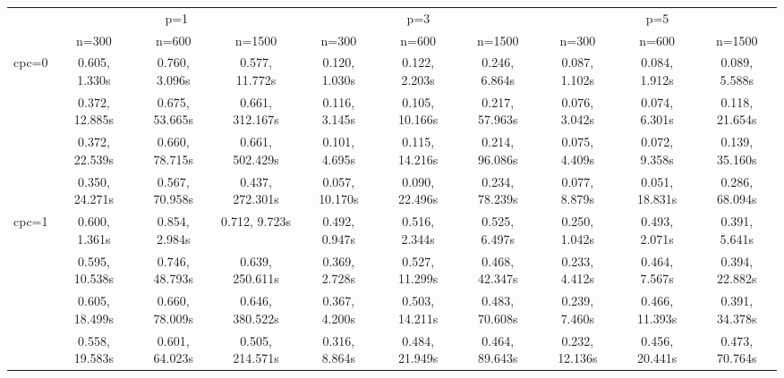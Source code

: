 \documentclass[article]{jss}
\begin{document}
\begin{landscape}

  \begin{table}[t!]
    \centering
    \begin{tabular}{@{}cccccccccc@{}}
    \toprule
                           & \multicolumn{3}{c}{p=1}                                            & \multicolumn{3}{c}{p=3}                                            & \multicolumn{3}{c}{p=5}                                            \\
                           & n=300                & n=600                & n=1500               & n=300                & n=600                & n=1500               & n=300                & n=600                & n=1500               \\ \midrule
    \multirow{4}{*}{cpc=0} & 0.605, 1.330s & 0.760, 3.096s & 0.577, 11.772s & 0.120, 1.030s & 0.122, 2.203s & 0.246, 6.864s & 0.087, 1.102s & 0.084, 1.912s & 0.089, 5.588s \\
                           & 0.372, 12.885s & 0.675, 53.665s & 0.661, 312.167s & 0.116, 3.145s & 0.105, 10.166s & 0.217, 57.963s & 0.076, 3.042s & 0.074, 6.301s & 0.118, 21.654s \\
                           & 0.372, 22.539s & 0.660, 78.715s & 0.661, 502.429s & 0.101, 4.695s & 0.115, 14.216s & 0.214, 96.086s & 0.075, 4.409s & 0.072, 9.358s & 0.139, 35.160s \\
                           & 0.350, 24.271s & 0.567, 70.958s & 0.437, 272.301s & 0.057, 10.170s & 0.090, 22.496s & 0.234, 78.239s & 0.077, 8.879s & 0.051, 18.831s & 0.286, 68.094s \\ \midrule
    \multirow{4}{*}{cpc=1} & 0.600, 1.361s & 0.854, 2.984s & 0.712, 9.723s & 0.492, 0.947s & 0.516, 2.344s & 0.525, 6.497s & 0.250, 1.042s & 0.493, 2.071s & 0.391, 5.641s \\
                           & 0.595, 10.538s & 0.746, 48.793s & 0.639, 250.611s & 0.369, 2.728s & 0.527, 11.299s & 0.468, 42.347s & 0.233, 4.412s & 0.464, 7.567s & 0.394, 22.882s \\
                           & 0.605, 18.499s & 0.660, 78.009s & 0.646, 380.522s & 0.367, 4.200s & 0.503, 14.211s & 0.483, 70.608s & 0.239, 7.460s & 0.466, 11.393s & 0.391, 34.378s \\
                           & 0.558, 19.583s & 0.601, 64.023s & 0.505, 214.571s & 0.316, 8.864s & 0.484, 21.949s & 0.464, 89.643s & 0.232, 12.136s & 0.456, 20.441s & 0.473, 70.764s \\ \midrule

\end{tabular}
\end{table}
\end{landscape}
\end{document}
